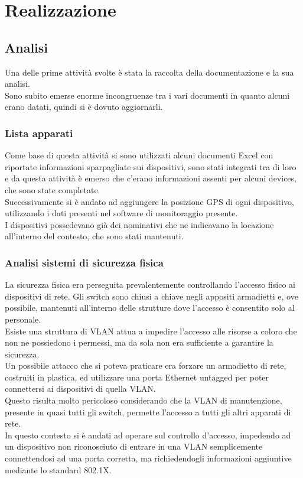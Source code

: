 \documentclass[Tesi.tex]{subfiles}
\begin{document}
\chapter{Realizzazione}

\section{Analisi}

Una delle prime attività svolte è stata la raccolta della documentazione e la sua analisi. \\
Sono subito emerse enorme incongruenze tra i vari documenti in quanto alcuni erano datati, quindi si è dovuto aggiornarli. \\

\subsection{Lista apparati}
Come base di questa attività si sono utilizzati alcuni documenti Excel con riportate informazioni sparpagliate sui dispositivi, sono stati integrati tra di loro e da questa attività è emerso che c'erano informazioni assenti per alcuni devices, che sono state completate. \\
Successivamente si è andato ad aggiungere la posizione GPS di ogni dispositivo, utilizzando i dati presenti nel software di monitoraggio presente. \\
I dispositivi possedevano già dei nominativi che ne indicavano la locazione all'interno del contesto, che sono stati mantenuti. \\

\subsection{Analisi sistemi di sicurezza fisica}
La sicurezza fisica era perseguita prevalentemente controllando l'accesso fisico ai dispositivi di rete. Gli switch sono chiusi a chiave negli appositi armadietti e, ove possibile, mantenuti all'interno delle strutture dove l'accesso è consentito solo al personale. \\
Esiste una struttura di VLAN attua a impedire l'accesso alle risorse a coloro che non ne possiedono i permessi, ma da sola non era sufficiente a garantire la sicurezza. \\
Un possibile attacco che si poteva praticare era forzare un armadietto di rete, costruiti in plastica, ed utilizzare una porta Ethernet untagged per poter connettersi ai dispositivi di quella VLAN. \\
Questo risulta molto pericoloso considerando che la VLAN di manutenzione, presente in quasi tutti gli switch, permette l'accesso a tutti gli altri apparati di rete. \\
In questo contesto si è andati ad operare sul controllo d'accesso, impedendo ad un dispositivo non riconosciuto di entrare in una VLAN semplicemente connettendosi ad una porta corretta, ma richiedendogli informazioni aggiuntive mediante lo standard 802.1X.
\end{document}
